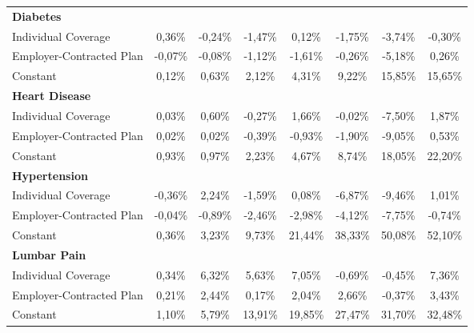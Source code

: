 \documentclass{article}
\begin{document}
\begin{table*}
{\begin{tabular}{l*{7}{c}}
\midrule
\textbf{Diabetes} & & & & & & & \\

Individual Coverage &   0,36\%  &  -0,24\%  &  -1,47\%\sym{*}  &   0,12\%  &  -1,75\%  &  -3,74\%  &  -0,30\% \\
Employer-Contracted Plan&  -0,07\%  &  -0,08\%  &  -1,12\%\sym{*}  &  -1,61\%\sym{*}  &  -0,26\%  &  -5,18\%\sym{*}  &   0,26\% \\
Constant            &   0,12\%\sym{*}  &   0,63\%\sym{***}&   2,12\%\sym{***}&   4,31\%\sym{***}&   9,22\%\sym{***}&  15,85\%\sym{***}&  15,65\%\sym{***}\\

\midrule
\textbf{Heart Disease} & & & & & & & \\

Individual Coverage &   0,03\%  &   0,60\%  &  -0,27\%  &   1,66\%  &  -0,02\%  &  -7,50\%\sym{**} &   1,87\% \\
Employer-Contracted Plan&   0,02\%  &   0,02\%  &  -0,39\%  &  -0,93\%  &  -1,90\%  &  -9,05\%\sym{***}&   0,53\% \\
Constant            &   0,93\%\sym{***}&   0,97\%\sym{***}&   2,23\%\sym{***}&   4,67\%\sym{***}&   8,74\%\sym{***}&  18,05\%\sym{***}&  22,20\%\sym{***}\\

\midrule
\textbf{Hypertension} & & & & & & & \\

Individual Coverage &  -0,36\%\sym{***}&   2,24\%  &  -1,59\%  &   0,08\%  &  -6,87\%\sym{*}  &  -9,46\%\sym{**} &   1,01\% \\
Employer-Contracted Plan&  -0,04\%  &  -0,89\%  &  -2,46\%\sym{*}  &  -2,98\%  &  -4,12\%  &  -7,75\%\sym{*}  &  -0,74\% \\
Constant            &   0,36\%\sym{***}&   3,23\%\sym{***}&   9,73\%\sym{***}&  21,44\%\sym{***}&  38,33\%\sym{***}&  50,08\%\sym{***}&  52,10\%\sym{***}\\

\midrule
\textbf{Lumbar Pain} & & & & & & & \\
Individual Coverage &   0,34\%  &    \cellcolor[gray]{0.9} 6,32\%\sym{**} &  \cellcolor[gray]{0.9} 5,63\%\sym{*}  &  \cellcolor[gray]{0.9} 7,05\%\sym{**} &    -0,69\%  &  -0,45\%  &   7,36\% \\
Employer-Contracted Plan&   0,21\%  &    \cellcolor[gray]{0.9}    2,44\%\sym{**} &   0,17\%  &   2,04\%  &   2,66\%  &  -0,37\%  &   3,43\% \\
Constant            &   1,10\%\sym{***}&   5,79\%\sym{***}&  13,91\%\sym{***}&  19,85\%\sym{***}&  27,47\%\sym{***}&  31,70\%\sym{***}&  32,48\%\sym{***}\\


\end{tabular}}
\end{table*}
\end{document}
